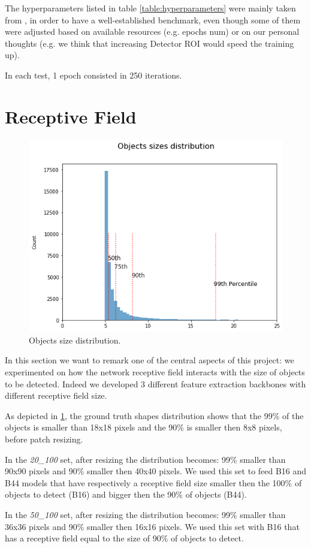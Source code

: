 \documentclass[a4paper,10pt]{report}
\begin{document}
The hyperparameters listed in table \ref{table:hyperparameters} were mainly taken from \cite{faster-rcnn}, in order to have a well-established benchmark, even though some of them were adjusted based on available resources (e.g. epochs num) or on our personal thoughts (e.g. we think that increasing Detector ROI would speed the training up).

In each test, 1 epoch consisted in 250 iterations.

\section{Receptive Field}\label{sec:receptive-field}
\begin{figure}[h]
  \center
  \includegraphics[width=0.65\linewidth]{objects_dist.png}
  \caption{Objects size distribution.}
  \label{fig:objects_dist}
\end{figure}
In this section we want to remark one of the central aspects of this project: we experimented on how the network receptive field interacts with the size of objects to be detected. Indeed we developed 3 different feature extraction backbones with different receptive field size.

As depicted in \ref{fig:objects_dist}, the ground truth shapes distribution shows that the 99\% of the objects is smaller than 18x18 pixels and the 90\% is smaller then 8x8 pixels, before patch resizing.

In the \emph{20\_100} set, after resizing the distribution becomes: 99\% smaller than 90x90 pixels and 90\% smaller then 40x40 pixels.
We used this set to feed B16 and B44 models that have respectively a receptive field size smaller then the 100\% of objects to detect (B16) and bigger then the 90\% of objects (B44).

In the \emph{50\_100} set, after resizing the distribution becomes: 99\% smaller than 36x36 pixels and 90\% smaller then 16x16 pixels.
We used this set with B16 that has a receptive field equal to the size of 90\% of objects to detect.
\end{document}

